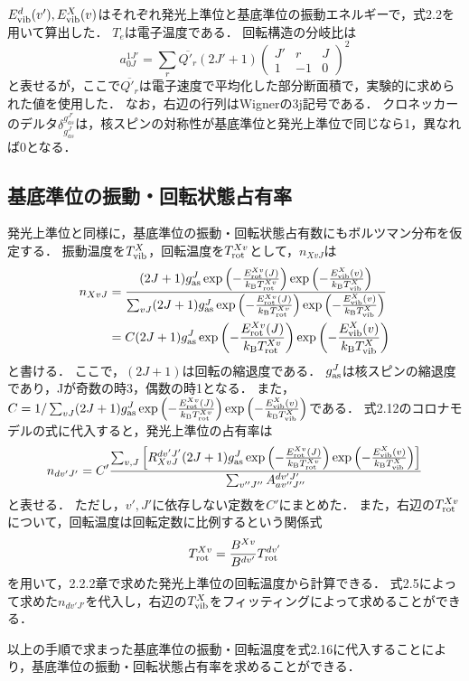 $E^d_{\rm vib} (v'), E^X_{\rm vib} (v)$はそれぞれ発光上準位と基底準位の振動エネルギーで，式2.2を用いて算出した．
$T_{e}$は電子温度である．
回転構造の分岐比は
\begin{equation}
    a^{1J'}_{0J} = \sum_r \overline{Q'_{r}} (2J'+1) \left( \begin{array}{ccc} J' & r & J \\ 1 & -1 & 0 \end{array} \right)^2
\end{equation}
と表せる\cite{kyokaisou}が，ここで$\overline{Q'_{r}}$は電子速度で平均化した部分断面積で，実験的に求められた値\cite{senkusya}を使用した．
なお，右辺の行列はWignerの3j記号である．
クロネッカーのデルタ$\delta^{g^{J'}_{as}}_{g^J_{as}}$は，核スピンの対称性が基底準位と発光上準位で同じなら1，異なれば0となる．

\subsection{基底準位の振動・回転状態占有率}
発光上準位と同様に，基底準位の振動・回転状態占有数にもボルツマン分布を仮定する．
振動温度を$T^X_{\rm vib}$，回転温度を$T^{Xv}_{\rm rot}$として，$n_{XvJ}$は
\begin{equation}
\begin{split}
    n_{XvJ} &= \frac{ (2J+1) g^J_{\rm as} \exp \left( - \frac{E^{Xv}_{\rm rot}(J)}{k_{\rm B} T^{Xv}_{\rm rot}} \right) \exp \left( - \frac{E^{X}_{\rm vib}(v)}{k_{\rm B} T^{X}_{\rm vib}} \right) }{\sum_{vJ} (2J+1) g^J_{\rm as} \exp \left( - \frac{E^{Xv}_{\rm rot}(J)}{k_{\rm B} T^{Xv}_{\rm rot}} \right) \exp \left( - \frac{E^{X}_{\rm vib}(v)}{k_{\rm B} T^{X}_{\rm vib}} \right)}\\
    &= C (2J+1) g^J_{\rm as} \exp \left( - \frac{E^{Xv}_{\rm rot}(J)}{k_{\rm B} T^{Xv}_{\rm rot}} \right) \exp \left( - \frac{E^{X}_{\rm vib}(v)}{k_{\rm B} T^{X}_{\rm vib}} \right)
\end{split}
\end{equation}
と書ける．
ここで，$(2J+1)$は回転の縮退度である．
$g^J_{\rm as}$は核スピンの縮退度であり，Jが奇数の時3，偶数の時1となる．
また，$C = 1 / \sum_{vJ} (2J+1) g^J_{\rm as} \exp \left( - \frac{E^{Xv}_{\rm rot}(J)}{k_{\rm B} T^{Xv}_{\rm rot}} \right) \exp \left( - \frac{E^{X}_{\rm vib}(v)}{k_{\rm B} T^{X}_{\rm vib}} \right)$である．
式2.12のコロナモデルの式に代入すると，発光上準位の占有率は
\begin{equation}
    n_{dv'J'} = C' \frac{ \sum_{v, J} \left[ R^{dv'J'}_{XvJ} (2J+1) g^J_{\rm as} \exp \left( - \frac{E^{Xv}_{\rm rot}(J)}{k_{\rm B} T^{Xv}_{\rm rot}} \right) \exp \left( - \frac{E^{X}_{\rm vib}(v)}{k_{\rm B} T^{X}_{\rm vib}} \right) \right] } { \sum_{v''J''} A^{dv'J'}_{av''J''} }
\end{equation}
と表せる．
ただし，$v', J'$に依存しない定数を$C'$にまとめた．
また，右辺の$T^{Xv}_{\rm rot}$について，回転温度は回転定数に比例するという関係式\cite{rot-temperature-ratio}
\begin{equation}
    T^{Xv}_{\rm rot} = \frac{B^{Xv}}{B^{dv'}} T^{dv'}_{\rm rot}
\end{equation}
を用いて，2.2.2章で求めた発光上準位の回転温度から計算できる．
式2.5によって求めた$n_{dv'J'}$を代入し，右辺の$T^{X}_{\rm vib}$をフィッティングによって求めることができる．

以上の手順で求まった基底準位の振動・回転温度を式2.16に代入することにより，基底準位の振動・回転状態占有率を求めることができる．